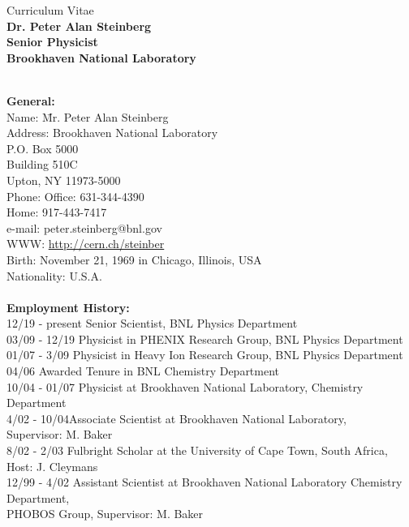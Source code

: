 \documentclass[11 pt]{article}
\begin{document}
\newcommand{\snn}{\sqrt{s_{NN}}}
\begin{center}
Curriculum Vitae \\
{\bf Dr. Peter Alan Steinberg}\\
{\bf Senior Physicist}\\
{\bf Brookhaven National Laboratory}\\
\end{center}

\begin{tabbing}
\\
{\bf General:}\\
Name: \hspace{2cm} \= Mr. Peter Alan Steinberg \\
Address: \> Brookhaven National Laboratory\\  
        \> P.O. Box 5000\\
        \> Building 510C \\
        \> Upton, NY 11973-5000 \\
Phone: \> Office: 631-344-4390 \\
       \> Home:   917-443-7417\\
e-mail: \> peter.steinberg@bnl.gov \\
WWW: \> \url{http://cern.ch/steinber} \\
Birth: \> November 21, 1969 in Chicago, Illinois, USA \\
Nationality: \> U.S.A. \\
\\
\textbf{Employment History:}\\
12/19 - present \> Senior Scientist, BNL Physics Department\\
03/09 - 12/19 \> Physicist in PHENIX Research Group, BNL Physics Department  \\
01/07 - 3/09 \> Physicist in Heavy Ion Research Group, BNL Physics Department  \\
04/06 \> Awarded Tenure in BNL Chemistry Department\\
10/04 - 01/07 \>Physicist at Brookhaven National Laboratory, Chemistry Department\\
4/02 - 10/04\>Associate Scientist at Brookhaven National Laboratory,\\ \> Supervisor: M. Baker\\
8/02 - 2/03\> Fulbright Scholar at the University of Cape Town, South Africa, Host: J. Cleymans\\
12/99 - 4/02 \>Assistant Scientist at Brookhaven National Laboratory Chemistry Department,\\ \> PHOBOS Group, Supervisor: M. Baker\\

\end{tabbing}
\end{document}
